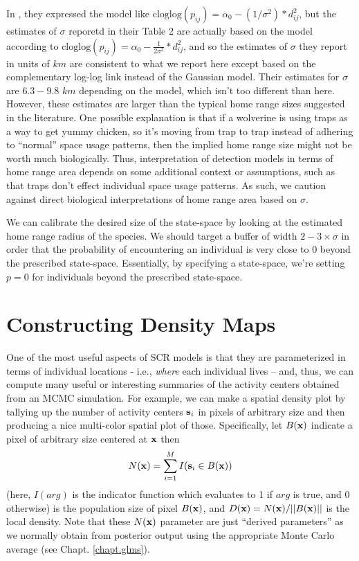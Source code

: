 {In \citet{royle_etal:2011jwm}, they expressed the model like
$\mbox{cloglog}(p_{ij}) = \alpha_{0} - (1/\sigma^2)*d_{ij}^2$, but the
estimates of $\sigma$ reporetd in their Table 2 are actually based on
the model according to $\mbox{cloglog}(p_{ij}) = \alpha_{0} -
\frac{1}{2\sigma^2}*d_{ij}^2$, and so the estimates of $\sigma$ they
report in units of $km$ are consistent to what we report here except
based on the complementary log-log link instead of the Gaussian
model. 
Their estimates for $\sigma$ are $6.3-9.8$ $km$
depending on the model,  which isn't too different than here. 
However, these estimates are larger than the typical home range sizes
suggested in the literature.
One possible explanation is that
if a wolverine is using traps as a way to get yummy chicken, so it's
moving from  trap to trap instead of adhering to ``normal'' space
usage patterns, then the implied home range size might not
be worth much biologically. 
Thus, interpretation of detection models in terms of
home range area depends on some additional context or assumptions,
such as that 
traps don't effect individual space usage
patterns. As such, we caution against direct biological
interpretations of home range area based on $\sigma$.

We can calibrate the
desired size of the state-space by looking at the estimated home range
radius of the species. We should target a buffer of width $2-3 \times
\sigma$ in order that the probability of encountering an individual is
very close to 0 beyond the prescribed state-space. Essentially, by specifying a
state-space, we're setting $p=0$ for individuals beyond the prescribed state-space.





\section{Constructing Density Maps}
\label{scr0.sec.mapping}

One of the most useful aspects of SCR models is that they are
parameterized in terms of individual locations - i.e., {\it where}
each individual lives -- and, thus, we can compute many useful or
interesting summaries of the activity centers obtained from an MCMC simulation.  
 For example, we can make a spatial density plot by
tallying up the number of activity centers ${\bf s}_{i}$ in pixels of
arbitrary size and then producing a nice multi-color spatial plot of
those.
Specifically, let $B({\bf x})$ indicate a pixel of arbitrary size centered at
${\bf x}$ then
\[
N({\bf x})=\sum_{i=1}^{M} I({\bf s}_{i} \in B({\bf x}))
\]
(here, $I(arg)$ is the indicator function which evaluates to 1 if
$arg$ is true, and 0 otherwise)
is the population size of pixel  $B({\bf x})$, and $D({\bf x}) = N({\bf
  x})/||B({\bf x})||$ is the local density. 
Note that these $N({\bf x})$ parameter are just ``derived
parameters'' as we normally obtain from posterior output using the
appropriate Monte Carlo average (see Chapt.  \ref{chapt.glms}).

}
